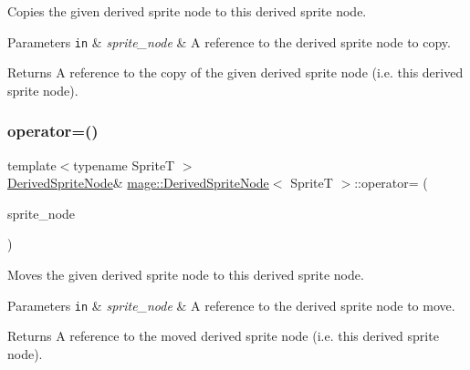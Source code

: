 Copies the given derived sprite node to this derived sprite node.


\begin{DoxyParams}[1]{Parameters}
\mbox{\tt in}  & {\em sprite\+\_\+node} & A reference to the derived sprite node to copy. \\
\hline
\end{DoxyParams}
\begin{DoxyReturn}{Returns}
A reference to the copy of the given derived sprite node (i.\+e. this derived sprite node). 
\end{DoxyReturn}
\hypertarget{classmage_1_1_derived_sprite_node_addd4a6c5019df92918e253e41f4e94ac}{}\label{classmage_1_1_derived_sprite_node_addd4a6c5019df92918e253e41f4e94ac} 
\subsubsection{\texorpdfstring{operator=()}{operator=()}\hspace{0.1cm}{\footnotesize\ttfamily [2/2]}}
{\footnotesize\ttfamily template$<$typename SpriteT $>$ \\
\hyperlink{classmage_1_1_derived_sprite_node}{Derived\+Sprite\+Node}\& \hyperlink{classmage_1_1_derived_sprite_node}{mage\+::\+Derived\+Sprite\+Node}$<$ SpriteT $>$\+::operator= (\begin{DoxyParamCaption}\item[{\hyperlink{classmage_1_1_derived_sprite_node}{Derived\+Sprite\+Node}$<$ SpriteT $>$ \&\&}]{sprite\+\_\+node }\end{DoxyParamCaption})\hspace{0.3cm}{\ttfamily [delete]}}

Moves the given derived sprite node to this derived sprite node.


\begin{DoxyParams}[1]{Parameters}
\mbox{\tt in}  & {\em sprite\+\_\+node} & A reference to the derived sprite node to move. \\
\hline
\end{DoxyParams}
\begin{DoxyReturn}{Returns}
A reference to the moved derived sprite node (i.\+e. this derived sprite node). 
\end{DoxyReturn}
